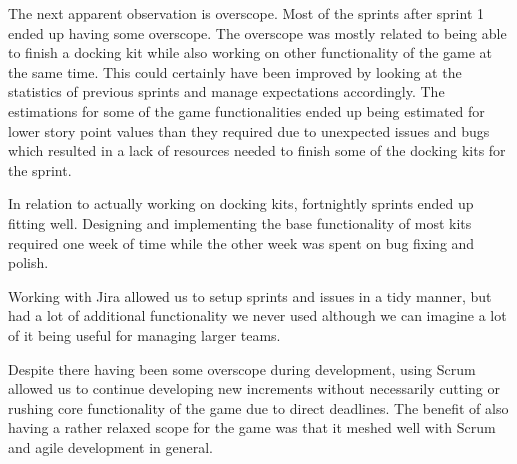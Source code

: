 The next apparent observation is overscope. Most of the sprints after sprint 1 ended up having some overscope. The overscope was mostly related to being able to finish a docking kit while also working on other functionality of the game at the same time. This could certainly have been improved by looking at the statistics of previous sprints and manage expectations accordingly. The estimations for some of the game functionalities ended up being estimated for lower story point values than they required due to unexpected issues and bugs which resulted in a lack of resources needed to finish some of the docking kits for the sprint. 

In relation to actually working on docking kits, fortnightly sprints ended up fitting well. Designing and implementing the base functionality of most kits required one week of time while the other week was spent on bug fixing and polish. 

Working with Jira allowed us to setup sprints and issues in a tidy manner, but had a lot of additional functionality we never used although we can imagine a lot of it being useful for managing larger teams. 

Despite there having been some overscope during development, using Scrum allowed us to continue developing new increments without necessarily cutting or rushing core functionality of the game due to direct deadlines. The benefit of also having a rather relaxed scope for the game was that it meshed well with Scrum and agile development in general. 